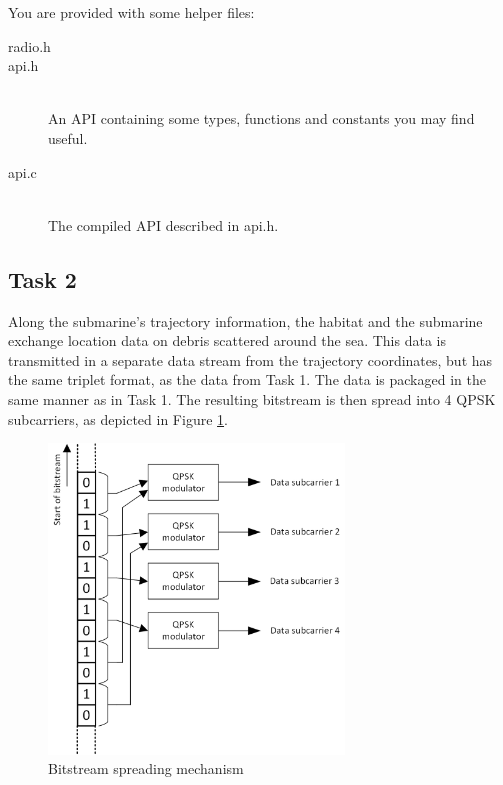\documentclass{article}
\begin{document}
You are provided with some helper files:
\begin{description}
	\item[radio.h]
	\item[api.h]
	\,\\ An API containing some types, functions and constants you may find useful.
	\item[api.c]
	\,\\ The compiled API described in \textsf{api.h}.
\end{description}


\subsection{Task 2}

Along the submarine's trajectory information, the habitat and the submarine exchange location data on debris scattered around the sea. This data is transmitted in a separate data stream from the trajectory coordinates, but has the same triplet format, as the data from Task 1. The data is packaged in the same manner as in Task 1. The resulting bitstream is then spread into 4 QPSK subcarriers, as depicted in Figure \ref{fig:spread}.
\begin{figure}[h!]
	\centering
	\includegraphics[width=0.7\textwidth]{Images/spread.png}
	\caption{Bitstream spreading mechanism}
	\label{fig:spread}
\end{figure}
\end{document}
